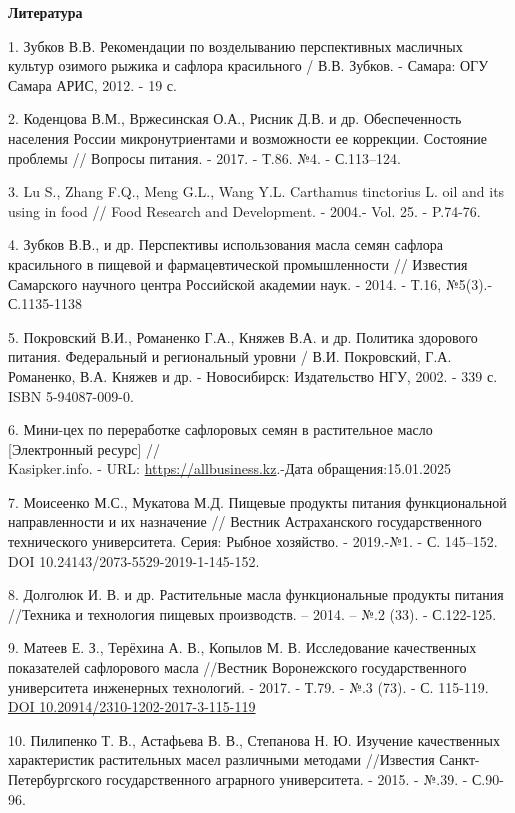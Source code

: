 \begin{center}
{\bfseries Литература}
\end{center}

\begin{references}
1. Зубков В.В. Рекомендации по возделыванию перспективных масличных
культур озимого рыжика и сафлора красильного / В.В. Зубков. - Самара:
ОГУ Самара АРИС, 2012. - 19 с.

2. Коденцова В.М., Вржесинская О.А., Рисник Д.В. и др. Обеспеченность
населения России микронутриентами и возможности ее коррекции. Состояние
проблемы // Вопросы питания. - 2017. - Т.86. №4. - С.113--124.

3. Lu S., Zhang F.Q., Meng G.L., Wang Y.L. Carthamus tinctorius L. oil
and its using in food // Food Research and Development. - 2004.- Vol.
25. - P.74-76.

4. Зубков В.В., и др. Перспективы использования масла семян сафлора
красильного в пищевой и фармацевтической промышленности // Известия
Самарского научного центра Российской академии наук. - 2014. - Т.16,
№5(3).- С.1135-1138

5. Покровский В.И., Романенко Г.А., Княжев В.А. и др. Политика здорового
питания. Федеральный и региональный уровни / В.И. Покровский, Г.А.
Романенко, В.А. Княжев и др. - Новосибирск: Издательство НГУ, 2002. -
339 с. ISBN 5-94087-009-0.

6. Мини-цех по переработке сафлоровых семян в растительное масло
{[}Электронный ресурс{]} // \\Kasipker.info. - URL:
\href{https://allbusiness.kz/mini-proizvodstvo/74-mini-ceh-po-pererabotke-saflorovyh-semyan-v-rastitelnoe-maslo.html}{https://allbusiness.kz}.-Дата
обращения:15.01.2025

7. Моисеенко М.С., Мукатова М.Д. Пищевые продукты питания функциональной
направленности и их назначение // Вестник Астраханского государственного
технического университета. Серия: Рыбное хозяйство. - 2019.-№1. - С.
145--152. DOI 10.24143/2073-5529-2019-1-145-152.

8. Долголюк И. В. и др. Растительные масла функциональные продукты
питания //Техника и технология пищевых производств. -- 2014. -- №.2
(33). - С.122-125.

9. Матеев Е. З., Терёхина А. В., Копылов М. В. Исследование качественных
показателей сафлорового масла //Вестник Воронежского государственного
университета инженерных технологий. - 2017. - Т.79. - №.3 (73). - С.
115-119. \href{https://doi.org/10.20914/2310-1202-2017-3-115-119}{DOI
10.20914/2310-1202-2017-3-115-119}

10. Пилипенко Т. В., Астафьева В. В., Степанова Н. Ю. Изучение
качественных характеристик растительных масел различными методами
//Известия Санкт-Петербургского государственного аграрного университета.
- 2015. - №.39. - С.90-96.
\end{references}

